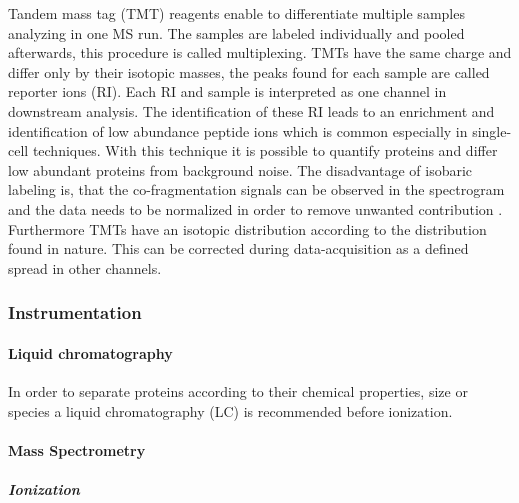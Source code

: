 \documentclass[
  11pt,
]{article}
\begin{document}
Tandem mass tag (TMT) reagents enable to differentiate multiple samples
analyzing in one MS run. The samples are labeled individually and pooled
afterwards, this procedure is called multiplexing. TMTs have the same
charge and differ only by their isotopic masses, the peaks found for
each sample are called reporter ions (RI). Each RI and sample is
interpreted as one channel in downstream analysis. The identification of
these RI leads to an enrichment and identification of low abundance
peptide ions which is common especially in single-cell techniques. With
this technique it is possible to quantify proteins and differ low
abundant proteins from background noise. The disadvantage of isobaric
labeling is, that the co-fragmentation signals can be observed in the
spectrogram and the data needs to be normalized in order to remove
unwanted contribution \citep{Marx2019, Budnik2018}. Furthermore TMTs
have an isotopic distribution according to the distribution found in
nature. This can be corrected during data-acquisition as a defined
spread in other channels.

\hypertarget{instrumentation}{%
\subsubsection{Instrumentation}\label{instrumentation}}

\hypertarget{liquid-chromatography}{%
\paragraph{Liquid chromatography}\label{liquid-chromatography}}

In order to separate proteins according to their chemical properties,
size or species a liquid chromatography (LC) is recommended before
ionization.

\hypertarget{mass-spectrometry-1}{%
\paragraph{Mass Spectrometry}\label{mass-spectrometry-1}}

\hypertarget{ionization}{%
\subparagraph{Ionization}\label{ionization}}
\end{document}
